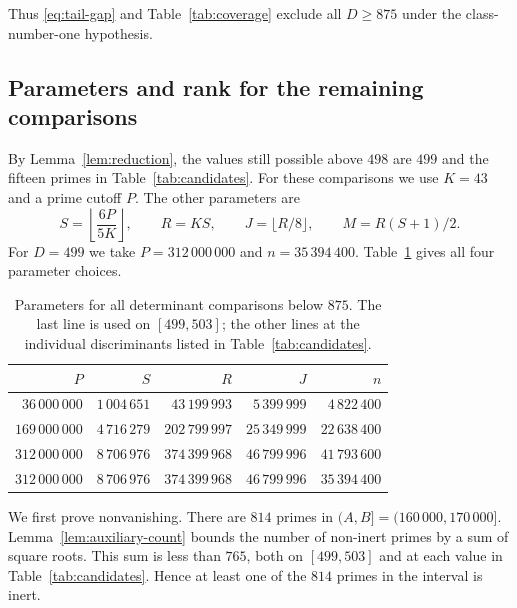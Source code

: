 Thus \eqref{eq:tail-gap} and
Table~\ref{tab:coverage} exclude all $D\geq875$ under the class-number-one
hypothesis.

\subsection{Parameters and rank for the remaining comparisons}
By Lemma~\ref{lem:reduction}, the values still possible above $498$ are $499$
and the fifteen primes in Table~\ref{tab:candidates}. For these comparisons
we use $K=43$ and a prime cutoff $P$. The other parameters are
\[
 S=\left\lfloor\frac{6P}{5K}\right\rfloor,
 \qquad R=KS,\qquad J=\lfloor R/8\rfloor,
 \qquad M=R(S+1)/2.
\]
For $D=499$ we take $P=312\,000\,000$ and $n=35\,394\,400$.
Table~\ref{tab:parameters} gives all four parameter choices.

\begin{table}[ht]
\centering
\begin{tabular}{rrrrr}
\toprule
$P$ & $S$ & $R$ & $J$ & $n$\\
\midrule
$36\,000\,000$ & $1\,004\,651$ & $43\,199\,993$ & $5\,399\,999$ & $4\,822\,400$\\
$169\,000\,000$ & $4\,716\,279$ & $202\,799\,997$ & $25\,349\,999$ & $22\,638\,400$\\
$312\,000\,000$ & $8\,706\,976$ & $374\,399\,968$ & $46\,799\,996$ & $41\,793\,600$\\
$312\,000\,000$ & $8\,706\,976$ & $374\,399\,968$ & $46\,799\,996$ & $35\,394\,400$\\
\bottomrule
\end{tabular}
\caption{Parameters for all determinant comparisons below $875$. The last
line is used on $[499,503]$; the other lines at the individual discriminants
listed in Table~\ref{tab:candidates}.}
\label{tab:parameters}
\end{table}

We first prove nonvanishing. There are $814$ primes in
$(A,B]=(160\,000,170\,000]$. Lemma~\ref{lem:auxiliary-count} bounds the number of non-inert primes
by a sum of square roots. This sum is less than $765$, both on $[499,503]$
and at each value in Table~\ref{tab:candidates}. Hence at least one of the
$814$ primes in the interval is inert.


